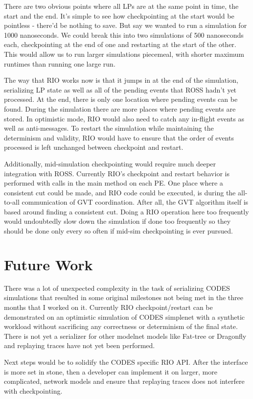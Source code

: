 \documentclass[letterpaper, 11 pt, conference]{IEEEtran}
\begin{document}
There are two obvious points where all LPs are at the same point in time, the start and the end. It's simple to see how checkpointing at the start would be pointless - there'd be nothing to save. But say we wanted to run a simulation for 1000 nanoseconds. We could break this into two simulations of 500 nanoseconds each, checkpointing at the end of one and restarting at the start of the other. This would allow us to run larger simulations piecemeal, with shorter maximum runtimes than running one large run.

The way that RIO works now is that it jumps in at the end of the simulation, serializing LP state as well as all of the pending events that ROSS hadn't yet processed. At the end, there is only one location where pending events can be found. During the simulation there are more places where pending events are stored. In optimistic mode, RIO would also need to catch any in-flight events as well as anti-messages. To restart the simulation while maintaining the determinism and validity, RIO would have to ensure that the order of events processed is left unchanged between checkpoint and restart.

Additionally, mid-simulation checkpointing would require much deeper integration with ROSS. Currently RIO's checkpoint and restart behavior is performed with calls in the main method on each PE. One place where a consistent cut could be made, and RIO code could be executed, is during the all-to-all communication of GVT coordination. After all, the GVT algorithm itself is based around finding a consistent cut. Doing a RIO operation here too frequently would undoubtedly slow down the simulation if done too frequently so they should be done only every so often if mid-sim checkpointing is ever pursued.

\section{Future Work}
There was a lot of unexpected complexity in the task of serializing CODES simulations that resulted in some original milestones not being met in the three months that I worked on it. Currently RIO checkpoint/restart can be demonstrated on an optimistic simulation of CODES simplenet with a synthetic workload without sacrificing any correctness or determinism of the final state. There is not yet a serializer for other modelnet models like Fat-tree or Dragonfly and replaying traces have not yet been performed.

Next steps would be to solidify the CODES specific RIO API. After the interface is more set in stone, then a developer can implement it on larger, more complicated, network models and ensure that replaying traces does not interfere with checkpointing.
\end{document}
